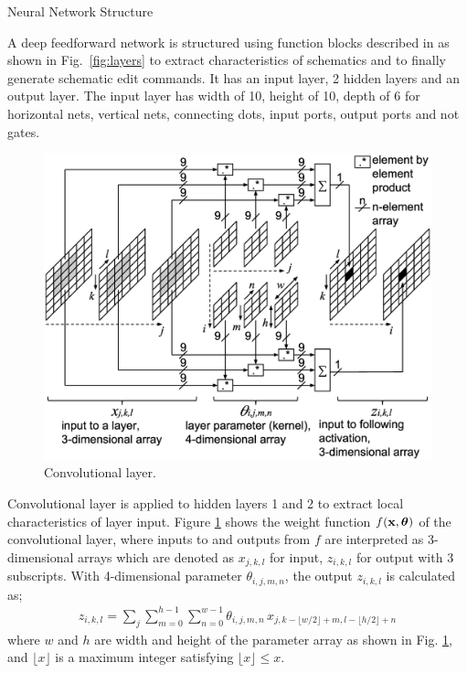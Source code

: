 \documentclass[twocolumn]{article}
\makeatletter
\def\section{\@startsection {section}{1}{\z@}{20pt plus 2pt minus 2pt}
{8pt plus 2pt minus 2pt}{\centering\normalsize\sc
\edef\@svsec{\thesection.\ }}}
\def\thesection{\Roman{section}}
\makeatother
\begin{document}
\section{Neural Network Structure}

A deep feedforward network is structured using function blocks
described in \cite{mit} as shown in Fig.\ \ref{fig:layers}
to extract characteristics of schematics and
to finally generate schematic edit commands.
It has an input layer, 2 hidden layers and an output layer.
The input layer has width of 10, height of 10,
depth of 6 for horizontal nets, vertical nets, connecting dots, input ports,
output ports and not gates.

\begin{figure}[!tb]
 \begin{center}
  \begin{minipage}{\hsize}
   \includegraphics[width=\hsize]{fig/layer_convolutional_03.eps}
   \caption{Convolutional layer.}
   \label{fig:layer_convolutional}
  \end{minipage}
 \end{center}
\end{figure}

Convolutional layer is applied to hidden layers 1 and 2
to extract local characteristics of layer input.
Figure \ref{fig:layer_convolutional} shows the weight function
$f({\bf x}, {\bm \theta})$ of the convolutional layer,
where inputs to and outputs from $f$ are interpreted as
3-dimensional arrays which are denoted as $x_{j,k,l}$ for input,
$z_{i,k,l}$ for output with 3 subscripts.
With 4-dimensional parameter $\theta_{i,j,m,n}$,
the output $z_{i,k,l}$ is calculated as;
\begin{eqnarray}
z_{i,k,l} = \sum_{j}\sum^{h-1}_{m=0}\sum^{w-1}_{n=0}
\theta_{i,j,m,n}\,
 x_{j,k - \lfloor w/2 \rfloor + m,l - \lfloor h/2 \rfloor + n}
\end{eqnarray}
where $w$ and $h$ are width and height of the parameter array
as shown in Fig. \ref{fig:layer_convolutional},
and $\lfloor x \rfloor$ is a maximum integer satisfying
$\lfloor x \rfloor \le x$.
\end{document}
